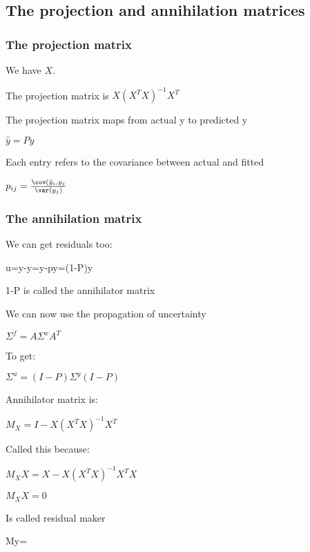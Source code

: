 
\subsection{The projection and annihilation matrices}

\subsubsection{The projection matrix}

We have \(X\).

The projection matrix is \(X(X^TX)^{-1}X^T\)

The projection matrix maps from actual y to predicted y

\(\hat y = Py\)

Each entry refers to the covariance between actual and fitted

\(p_{ij}=\frac{\cov (\hat y_i, y_j}{\var (y_j)}\)

\subsubsection{The annihilation matrix}

We can get residuals too:

u=y-\hat y=y-py=(1-P)y

1-P is called the annihilator matrix

We can now use the propagation of uncertainty

\(\Sigma^f = A\Sigma^x A^T\)

To get:

\(\Sigma^u = (I-P)\Sigma^y (I-P)\)

Annihilator matrix is:

\(M_X=I-X(X^TX)^{-1}X^T\)

Called this because:

\(M_XX=X-X(X^TX)^{-1}X^TX\)

\(M_XX=0\)

Is called residual maker

My=\epsilon
 
